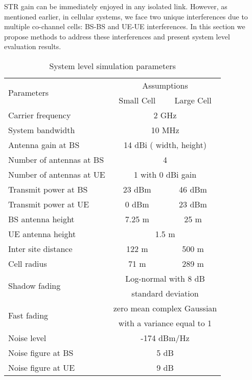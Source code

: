 \documentclass[twocolumn]{IEEEtran}
\begin{document}
STR gain can be immediately enjoyed in any isolated link. However,
as mentioned earlier, in cellular systems, we face two unique
interferences due to multiple co-channel cells: BS-BS and UE-UE
interferences. In this section we propose methods to address these
interferences and present system level evaluation results.


\begin{table}[ht]
\caption{System level simulation parameters}
\begin{small}
\begin{tabular}{l||c|c}
\hline
  \hline
\multirow{2}{*}{Parameters} &\multicolumn{2}{c}{Assumptions}   \\
    \cline{2-3}
   & Small Cell  & Large Cell \\
  \hline
  \hline
  Carrier frequency & \multicolumn{2}{c}{2 GHz}   \\
  \hline
  System bandwidth & \multicolumn{2}{c}{10 MHz}   \\
  \hline
  Antenna gain at BS & \multicolumn{2}{c}{14 dBi ( width,  height)}   \\
  \hline
  Number of antennas at BS & \multicolumn{2}{c}{4}   \\
   \hline
  Number of antennas at UE & \multicolumn{2}{c}{1 with 0 dBi gain}   \\
  \hline
  Transmit power at BS & 23 dBm & 46 dBm \\
  \hline
  Transmit power at UE & 0 dBm & 23 dBm \\
  \hline
  BS antenna height & 7.25 m & 25 m \\
  \hline
  UE antenna height & \multicolumn{2}{c}{1.5 m}  \\
  \hline
  Inter site distance & 122 m & 500 m \\
  \hline
  Cell radius & 71 m & 289 m \\
  \hline
  \multirow{2}{*}{Shadow fading} & \multicolumn{2}{c}{Log-normal with 8 dB}  \\
  &\multicolumn{2}{c}{standard deviation \cite{3gpp} } \\
  \hline
  \multirow{2}{*}{Fast fading} & \multicolumn{2}{c}{zero mean complex Gaussian}  \\
   & \multicolumn{2}{c}{with a variance equal to 1}  \\
  \hline
  Noise level & \multicolumn{2}{c}{-174 dBm/Hz}  \\
  \hline
  Noise figure at BS & \multicolumn{2}{c}{5 dB}  \\
  \hline
  Noise figure at UE & \multicolumn{2}{c}{9 dB}  \\
\hline \hline
\end{tabular}
\end{small}
\end{table}
\end{document}
